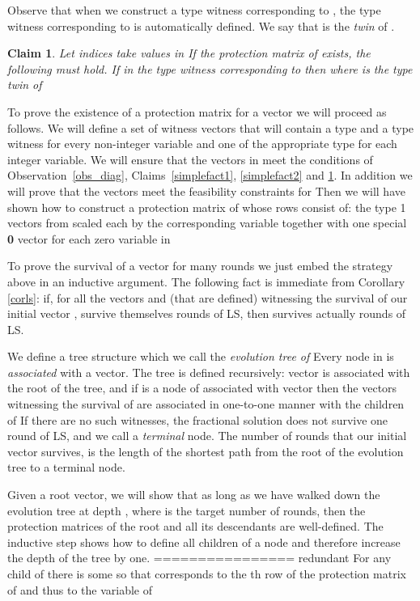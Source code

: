 \documentclass[11pt]{article}\usepackage{amsmath}
\newtheorem{claim}{Claim}[section]
\begin{document}
Observe that  when we construct a  type  witness   corresponding to ,
 the type   witness   corresponding  to  is  automatically defined. We
 say that  is the \emph{twin} of  .
 
\begin{claim}\label{simplefact3}
Let indices  take values in  If the protection matrix of 
exists, 
the following must hold. 
If  in the type  witness  corresponding to
  then
 where  is the  type  twin of 
\end{claim}


To prove the existence of a  protection matrix  for a vector  we
will proceed as follows. We will define a set  of witness
vectors that  will contain a type   and a type   witness for every
non-integer variable and  one of the appropriate type  for each 
integer  variable. We  will ensure  that the  vectors in    meet the
conditions of Observation~\ref{obs_diag}, Claims~\ref{simplefact1},
\ref{simplefact2}  and \ref{simplefact3}. In  addition  we will prove 
that the vectors
meet the  feasibility constraints for  Then 
we will have shown how to  construct  a protection matrix  of  whose rows
consist of: 
the type  1 vectors  from  scaled each  by the  corresponding variable
 together with  one special {\bf  0} vector  for each zero variable in 



To prove  the survival of a vector  for many rounds we  just embed the
strategy above in an inductive argument. 
The following fact  is immediate from Corollary
\ref{corls}:   if,   for   all      the   vectors      and
 (that are  defined) witnessing the survival of
our initial vector , survive  themselves  rounds of LS, then 
survives actually  rounds of LS. 


We
define a tree structure which we 
call the  \emph{evolution tree  of } Every node in  is {\em
  associated} with a vector. The tree is defined 
recursively: vector  is associated with the root of the tree, and if  is a node
of  associated with vector   then  the vectors  witnessing the
survival of  
are associated in one-to-one manner with the children 
of  If  there are no such witnesses,  the fractional solution   does
not survive one round of LS, and  we call  a \emph{terminal} node. 
The number  of rounds  that our
initial vector  survives, is the length of the shortest path from the root of
the evolution tree   to a terminal node.


Given a root vector, we will show that as long as we have walked down the
evolution tree at depth , where   is the target number of rounds, then the
protection matrices of the root and all its descendants are well-defined. 
The inductive step shows how to define all children of a node  and
therefore increase the depth of the tree by one. 
\iffalse ================ redundant
 For any child 
of    there is some  so that 
 corresponds to 
the th row of the protection matrix  of  and thus   to the
variable  of    
\end{document}
